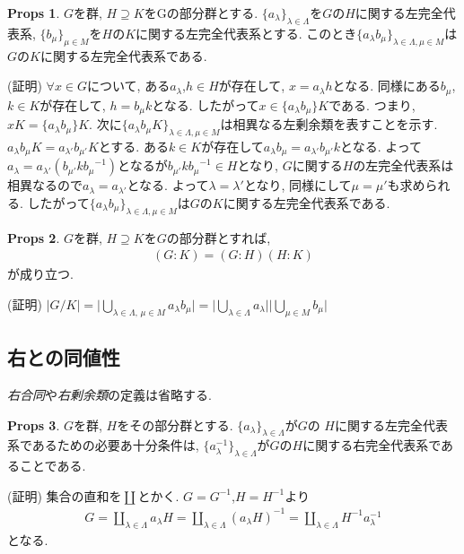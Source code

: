 \documentclass[dvipdfmx]{jsarticle}
\theoremstyle{definition}
\newtheorem{props}{Props}
\numberwithin{equation}{section}
\numberwithin{props}{section}
\numberwithin{definition}{section}
\numberwithin{note}{section}
\begin{document}
\begin{props}
     $G$を群, $H\supseteq K$をGの部分群とする. $\lbrace a_\lambda \rbrace_{\lambda \in \Lambda}$を$G$の$H$に関する左完全代表系, $\lbrace b_\mu \rbrace_{\mu \in M}$を$H$の$K$に関する左完全代表系とする. このとき$\lbrace a_\lambda b_\mu\rbrace_{\lambda\in \Lambda,\mu\in M}$は$G$の$K$に関する左完全代表系である.
\end{props}
(証明) $\forall x\in G$について, ある$a_\lambda$,$h\in H$が存在して, $x=a_\lambda h$となる. 同様にある$b_\mu$,$k\in K$が存在して, $h=b_\mu k$となる. したがって$x\in \lbrace a_\lambda b_\mu\rbrace K$である. つまり, $xK= \lbrace a_\lambda b_\mu\rbrace K$. 次に$\lbrace a_\lambda b_\mu K\rbrace_{\lambda\in \Lambda,\mu\in M}$は相異なる左剰余類を表すことを示す.
$a_\lambda b_\mu K=a_{\lambda'}b_{\mu'}K$とする. ある$k\in K$が存在して$a_\lambda b_\mu=a_{\lambda'}b_{\mu'}k$となる. よって$a_\lambda=a_{\lambda'}(b_{\mu'}k{b_\mu}^{-1})$となるが$b_{\mu'}k{b_\mu}^{-1}\in H$となり, $G$に関する$H$の左完全代表系は相異なるので$a_\lambda=a_{\lambda'}$となる. よって$\lambda=\lambda'$となり, 同様にして$\mu=\mu'$も求められる. したがって$\lbrace a_\lambda b_\mu\rbrace_{\lambda\in \Lambda,\mu\in M}$は$G$の$K$に関する左完全代表系である.
\begin{props}
     $G$を群, $H\supseteq K$を$G$の部分群とすれば,
     \begin{align}
          (G:K)=(G:H)(H:K)
     \end{align}
     が成り立つ.
\end{props}
(証明) $\lvert G/K\rvert =\lvert \bigcup_{\lambda\in \Lambda,\,\mu\in M}a_\lambda b_\mu\rvert=\lvert \bigcup_{\lambda\in \Lambda}a_\lambda\rvert\lvert \bigcup_{\mu\in M}b_\mu\rvert$

\subsection{右との同値性}
\emph{右合同}や\emph{右剰余類}の定義は省略する.
\begin{props}
     $G$を群, $H$をその部分群とする. $\lbrace a_\lambda\rbrace_{\lambda\in \Lambda}$が$G$の
     $H$に関する左完全代表系であるための必要あ十分条件は, $\lbrace a_\lambda^{-1}\rbrace_{\lambda\in \Lambda}$が$G$の$H$に関する右完全代表系であることである.
\end{props}
(証明) 集合の直和を$\coprod$とかく. $G=G^{-1}$,$H=H^{-1}$より
\begin{align}
     G=\coprod_{\lambda\in \Lambda}a_\lambda H=\coprod_{\lambda\in \Lambda}(a_\lambda H)^{-1}=\coprod_{\lambda\in \Lambda}H^{-1}a_\lambda^{-1}
\end{align}
となる.
\end{document}
